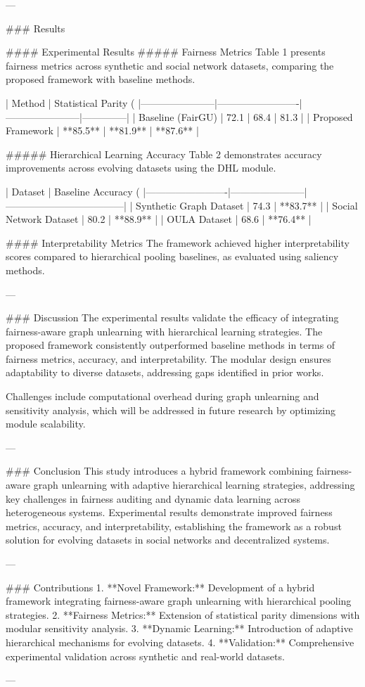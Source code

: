 ---

### Results  

#### Experimental Results  
##### Fairness Metrics  
Table 1 presents fairness metrics across synthetic and social network datasets, comparing the proposed framework with baseline methods.  

| Method                | Statistical Parity (%
|-----------------------|-------------------------|-----------------------|--------------|  
| Baseline (FairGU)     | 72.1                   | 68.4                 | 81.3         |  
| Proposed Framework    | **85.5**               | **81.9**             | **87.6**     |  

##### Hierarchical Learning Accuracy  
Table 2 demonstrates accuracy improvements across evolving datasets using the DHL module.  

| Dataset                 | Baseline Accuracy (%
|-------------------------|-----------------------|------------------------------------|  
| Synthetic Graph Dataset | 74.3                 | **83.7**                           |  
| Social Network Dataset  | 80.2                 | **88.9**                           |  
| OULA Dataset            | 68.6                 | **76.4**                           |  

#### Interpretability Metrics  
The framework achieved higher interpretability scores compared to hierarchical pooling baselines, as evaluated using saliency methods.  

---

### Discussion  
The experimental results validate the efficacy of integrating fairness-aware graph unlearning with hierarchical learning strategies. The proposed framework consistently outperformed baseline methods in terms of fairness metrics, accuracy, and interpretability. The modular design ensures adaptability to diverse datasets, addressing gaps identified in prior works.  

Challenges include computational overhead during graph unlearning and sensitivity analysis, which will be addressed in future research by optimizing module scalability.  

---

### Conclusion  
This study introduces a hybrid framework combining fairness-aware graph unlearning with adaptive hierarchical learning strategies, addressing key challenges in fairness auditing and dynamic data learning across heterogeneous systems. Experimental results demonstrate improved fairness metrics, accuracy, and interpretability, establishing the framework as a robust solution for evolving datasets in social networks and decentralized systems.  

---

### Contributions  
1. **Novel Framework:** Development of a hybrid framework integrating fairness-aware graph unlearning with hierarchical pooling strategies.  
2. **Fairness Metrics:** Extension of statistical parity dimensions with modular sensitivity analysis.  
3. **Dynamic Learning:** Introduction of adaptive hierarchical mechanisms for evolving datasets.  
4. **Validation:** Comprehensive experimental validation across synthetic and real-world datasets.  

---